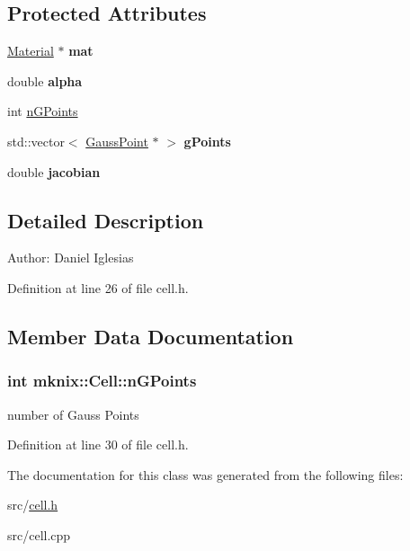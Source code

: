 \subsection*{Protected Attributes}
\begin{CompactItemize}
\item 
\hypertarget{classmknix_1_1Cell_83ca13ff89196b3ab378d2a28820a08e}{
\hyperlink{classmknix_1_1Material}{Material} $\ast$ \textbf{mat}}
\label{classmknix_1_1Cell_83ca13ff89196b3ab378d2a28820a08e}

\item 
\hypertarget{classmknix_1_1Cell_79afef7ecbdfee69e687bb2e7559520b}{
double \textbf{alpha}}
\label{classmknix_1_1Cell_79afef7ecbdfee69e687bb2e7559520b}

\item 
int \hyperlink{classmknix_1_1Cell_7d406d6e6f58c14da07387723986ae38}{nGPoints}
\item 
\hypertarget{classmknix_1_1Cell_980ae62ad7e6dda296257455ee173f86}{
std::vector$<$ \hyperlink{classmknix_1_1GaussPoint}{GaussPoint} $\ast$ $>$ \textbf{gPoints}}
\label{classmknix_1_1Cell_980ae62ad7e6dda296257455ee173f86}

\item 
\hypertarget{classmknix_1_1Cell_4922bf34ba543606a8d9c5ca4847b589}{
double \textbf{jacobian}}
\label{classmknix_1_1Cell_4922bf34ba543606a8d9c5ca4847b589}

\end{CompactItemize}


\subsection{Detailed Description}
\begin{Desc}
\item[Author:]Daniel Iglesias \end{Desc}


Definition at line 26 of file cell.h.

\subsection{Member Data Documentation}
\hypertarget{classmknix_1_1Cell_7d406d6e6f58c14da07387723986ae38}{
\subsubsection{\setlength{\rightskip}{0pt plus 5cm}int {\bf mknix::Cell::nGPoints}}}
\label{classmknix_1_1Cell_7d406d6e6f58c14da07387723986ae38}


number of Gauss Points 

Definition at line 30 of file cell.h.

The documentation for this class was generated from the following files:\begin{CompactItemize}
\item 
src/\hyperlink{cell_8h}{cell.h}\item 
src/cell.cpp\end{CompactItemize}
